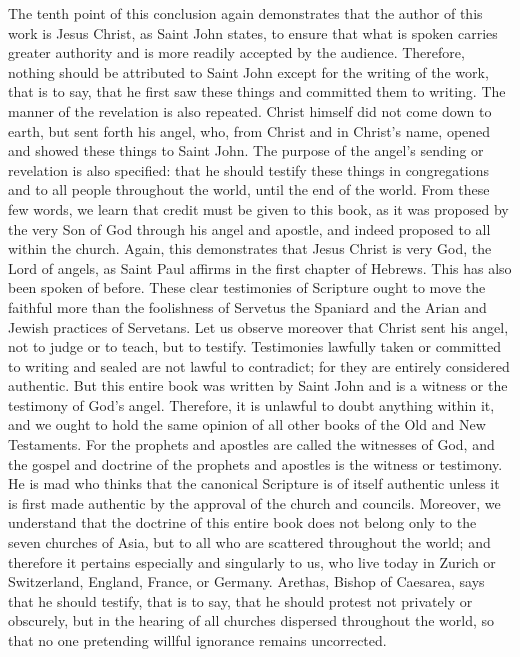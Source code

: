 The tenth point of this conclusion again demonstrates that the author of this work is Jesus Christ, as Saint John states, to ensure that what is spoken carries greater authority and is more readily accepted by the audience. Therefore, nothing should be attributed to Saint John except for the writing of the work, that is to say, that he first saw these things and committed them to writing. The manner of the revelation is also repeated. Christ himself did not come down to earth, but sent forth his angel, who, from Christ and in Christ’s name, opened and showed these things to Saint John. The purpose of the angel’s sending or revelation is also specified: that he should testify these things in congregations and to all people throughout the world, until the end of the world. From these few words, we learn that credit must be given to this book, as it was proposed by the very Son of God through his angel and apostle, and indeed proposed to all within the church. Again, this demonstrates that Jesus Christ is very God, the Lord of angels, as Saint Paul affirms in the first chapter of Hebrews. This has also been spoken of before. These clear testimonies of Scripture ought to move the faithful more than the foolishness of Servetus the Spaniard and the Arian and Jewish practices of Servetans. Let us observe moreover that Christ sent his angel, not to judge or to teach, but to testify. Testimonies lawfully taken or committed to writing and sealed are not lawful to contradict; for they are entirely considered authentic. But this entire book was written by Saint John and is a witness or the testimony of God’s angel. Therefore, it is unlawful to doubt anything within it, and we ought to hold the same opinion of all other books of the Old and New Testaments. For the prophets and apostles are called the witnesses of God, and the gospel and doctrine of the prophets and apostles is the witness or testimony. He is mad who thinks that the canonical Scripture is of itself authentic unless it is first made authentic by the approval of the church and councils. Moreover, we understand that the doctrine of this entire book does not belong only to the seven churches of Asia, but to all who are scattered throughout the world; and therefore it pertains especially and singularly to us, who live today in Zurich or Switzerland, England, France, or Germany. Arethas, Bishop of Caesarea, says that he should testify, that is to say, that he should protest not privately or obscurely, but in the hearing of all churches dispersed throughout the world, so that no one pretending willful ignorance remains uncorrected.

